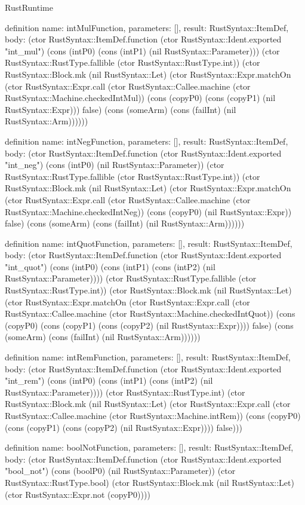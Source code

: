 \begin{lexlean}{RustRuntime}
\begin{semanticmodule}
definition{
  name: intMulFunction,
  parameters: [],
  result: RustSyntax::ItemDef,
  body: (ctor RustSyntax::ItemDef.function (ctor RustSyntax::Ident.exported "int_mul") (cons (intP0) (cons (intP1) (nil RustSyntax::Parameter))) (ctor RustSyntax::RustType.fallible (ctor RustSyntax::RustType.int)) (ctor RustSyntax::Block.mk (nil RustSyntax::Let) (ctor RustSyntax::Expr.matchOn (ctor RustSyntax::Expr.call (ctor RustSyntax::Callee.machine (ctor RustSyntax::Machine.checkedIntMul)) (cons (copyP0) (cons (copyP1) (nil RustSyntax::Expr))) false) (cons (someArm) (cons (failInt) (nil RustSyntax::Arm))))))
}

definition{
  name: intNegFunction,
  parameters: [],
  result: RustSyntax::ItemDef,
  body: (ctor RustSyntax::ItemDef.function (ctor RustSyntax::Ident.exported "int_neg") (cons (intP0) (nil RustSyntax::Parameter)) (ctor RustSyntax::RustType.fallible (ctor RustSyntax::RustType.int)) (ctor RustSyntax::Block.mk (nil RustSyntax::Let) (ctor RustSyntax::Expr.matchOn (ctor RustSyntax::Expr.call (ctor RustSyntax::Callee.machine (ctor RustSyntax::Machine.checkedIntNeg)) (cons (copyP0) (nil RustSyntax::Expr)) false) (cons (someArm) (cons (failInt) (nil RustSyntax::Arm))))))
}

definition{
  name: intQuotFunction,
  parameters: [],
  result: RustSyntax::ItemDef,
  body: (ctor RustSyntax::ItemDef.function (ctor RustSyntax::Ident.exported "int_quot") (cons (intP0) (cons (intP1) (cons (intP2) (nil RustSyntax::Parameter)))) (ctor RustSyntax::RustType.fallible (ctor RustSyntax::RustType.int)) (ctor RustSyntax::Block.mk (nil RustSyntax::Let) (ctor RustSyntax::Expr.matchOn (ctor RustSyntax::Expr.call (ctor RustSyntax::Callee.machine (ctor RustSyntax::Machine.checkedIntQuot)) (cons (copyP0) (cons (copyP1) (cons (copyP2) (nil RustSyntax::Expr)))) false) (cons (someArm) (cons (failInt) (nil RustSyntax::Arm))))))
}

definition{
  name: intRemFunction,
  parameters: [],
  result: RustSyntax::ItemDef,
  body: (ctor RustSyntax::ItemDef.function (ctor RustSyntax::Ident.exported "int_rem") (cons (intP0) (cons (intP1) (cons (intP2) (nil RustSyntax::Parameter)))) (ctor RustSyntax::RustType.int) (ctor RustSyntax::Block.mk (nil RustSyntax::Let) (ctor RustSyntax::Expr.call (ctor RustSyntax::Callee.machine (ctor RustSyntax::Machine.intRem)) (cons (copyP0) (cons (copyP1) (cons (copyP2) (nil RustSyntax::Expr)))) false)))
}

definition{
  name: boolNotFunction,
  parameters: [],
  result: RustSyntax::ItemDef,
  body: (ctor RustSyntax::ItemDef.function (ctor RustSyntax::Ident.exported "bool_not") (cons (boolP0) (nil RustSyntax::Parameter)) (ctor RustSyntax::RustType.bool) (ctor RustSyntax::Block.mk (nil RustSyntax::Let) (ctor RustSyntax::Expr.not (copyP0))))
}


\end{semanticmodule}
\end{lexlean}
